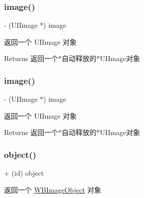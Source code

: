 \subsubsection{\texorpdfstring{image()}{image()}\hspace{0.1cm}{\footnotesize\ttfamily [2/3]}}
{\footnotesize\ttfamily -\/ (U\+I\+Image $\ast$) image \begin{DoxyParamCaption}{ }\end{DoxyParamCaption}}

返回一个 U\+I\+Image 对象

\begin{DoxyReturn}{Returns}
返回一个$\ast$自动释放的$\ast$\+U\+I\+Image对象 
\end{DoxyReturn}
\mbox{\label{interface_w_b_image_object_a0e4303982ee2db332462c93f48805f2d}} 
\subsubsection{\texorpdfstring{image()}{image()}\hspace{0.1cm}{\footnotesize\ttfamily [3/3]}}
{\footnotesize\ttfamily -\/ (U\+I\+Image $\ast$) image \begin{DoxyParamCaption}{ }\end{DoxyParamCaption}}

返回一个 U\+I\+Image 对象

\begin{DoxyReturn}{Returns}
返回一个$\ast$自动释放的$\ast$\+U\+I\+Image对象 
\end{DoxyReturn}
\mbox{\label{interface_w_b_image_object_abbfcbcca8af541d7f42fe670df3507cc}} 
\subsubsection{\texorpdfstring{object()}{object()}\hspace{0.1cm}{\footnotesize\ttfamily [1/3]}}
{\footnotesize\ttfamily + (id) object \begin{DoxyParamCaption}{ }\end{DoxyParamCaption}}

返回一个 \mbox{\hyperlink{interface_w_b_image_object}{W\+B\+Image\+Object}} 对象

